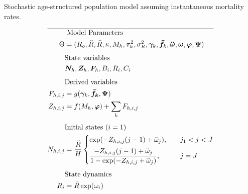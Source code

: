     \begin{table}
    \centering
    \caption{ Stochastic age-structured population model assuming instantaneous mortality rates. }
    \label{tab:stochastic_population_model}
    \tableEq
    \begin{align}
        \hline \nonumber
        &\mbox{ Model Parameters } \nonumber \\
        \Theta &= (R_o,\ddot{R},\bar{R},\kappa,M_h,\bm{\tau}^{2}_{k},
        \sigma_R^2,\bm{\gamma}_k, \bm{\bar{f}}_k,\bm{\ddot{\omega}},
        \bm{\omega},\bm{\varphi},\bm{\Psi})                             \label{T3.1} \\[1ex]
        &\mbox{State variables} \nonumber \\
        &\bm{N}_h, \bm{Z}_h, \bm{F}_h, B_i, R_i, C_i                    \label{T3.2} \\[1ex]
        &\mbox{Derived variables} \nonumber \\
        F_{h,i,j}&= g(\bm{\gamma}_k,\bm{\bar{f}_k},\bm{\Psi})           \label{T3.3} \\
        Z_{h,i,j}&= f(M_h,\bm{\varphi})
        + \sum_k  F_{h,i,j}                                             \label{T3.4} \\[1ex]
        &\mbox{Initial states $(i = 1)$} \nonumber \\
        N_{h,i,j} &= \dfrac{\ddot{R}}{H}
        \begin{cases}
        \exp(-Z_{h,i,j}(j-1)+\ddot{\omega}_j),
        &\quad j_1 < j < J \\[1ex]
        \dfrac{-Z_{h,i,j}(j-1)+\ddot{\omega}_j}{1-\exp(-Z_{h,i,j}+\ddot{\omega}_j)},
        &\quad j = J
        \end{cases}                                                     \label{T3.5} \\[1ex]
        &\mbox{State dynamics} \nonumber \\
        R_i &= \bar{R} \exp(\omega_i)                                   \label{T3.7} \\

\end{align}
\end{table}
